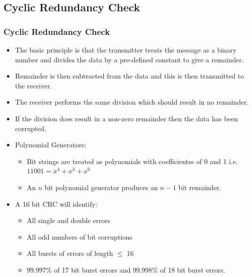 \documentclass{beamer}
\begin{document}
\subsection{Cyclic Redundancy Check}
\begin{frame}
\frametitle{Cyclic Redundancy Check}
\begin{itemize}
\tiny
\item The basic principle is that the transmitter treats the message as a binary number and divides the data by a pre-defined constant to give a remainder.
\item Remainder is then subtracted from the data and this is then transmitted to the receiver.
\item The receiver performs the same division which should result in no remainder.
\item If the division does result in a non-zero remainder then the data has been corrupted.
\item Polynomial Generators:
\begin{itemize}
\tiny
\item Bit strings are treated as polynomials with coefficientss of 0 and 1 i.e.\\
$11001 = x^4+x^3+x^0$
\item An $n$ bit polynomial generator produces an $n-1$ bit remainder.
\end{itemize}
\item A 16 bit CRC will identify:
\begin{itemize}
\tiny
\item All single and double errors
\item All odd numbers of bit corruptions
\item All bursts of errors of length $\leq$ 16
\item 99.997\% of 17 bit burst errors and 99.998\% of 18 bit burst errors.
\end{itemize}
\end{itemize}
\end{frame}
\end{document}
